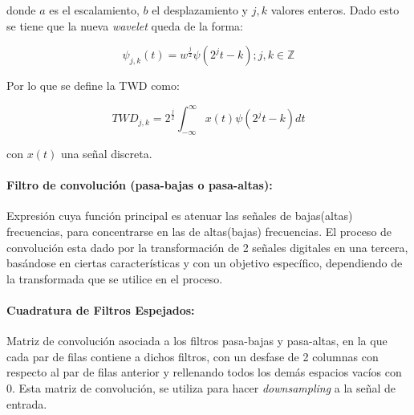 \documentclass[11pt]{article}
\begin{document}
donde \(a\) es el escalamiento, \(b\) el desplazamiento y \(j, k\) valores enteros. Dado esto se tiene que la nueva {\it wavelet} queda de la forma:

\begin{equation*}
    \psi_{j, k}(t)= w^{\frac{j}{2}}\psi(2^{j}t - k); j, k \in \mathbb{Z}
\end{equation*}

Por lo que se define la TWD como:

\begin{equation*}
    TWD_{j, k} = 2^{\frac{j}{2}}\int_{-\infty}^{\infty}x(t)\psi(2^{j}t-k)dt
\end{equation*}

con \(x(t)\) una señal discreta. 

\paragraph*{Filtro de convolución (pasa-bajas o pasa-altas):}
Expresión cuya función principal es atenuar las señales de bajas(altas) frecuencias, para concentrarse en las de altas(bajas) frecuencias. El proceso de convolución esta dado por la transformación de 2 señales digitales en una tercera, basándose en ciertas 
características y con un objetivo específico, dependiendo de la transformada que se utilice en el proceso.

\paragraph*{Cuadratura de Filtros Espejados:}
Matriz de convolución asociada a los filtros pasa-bajas y pasa-altas, en la que cada par de filas contiene a dichos filtros, con un desfase de 2 columnas con respecto al par de filas anterior y rellenando todos los demás espacios vacíos con 0. Esta matriz de convolución, 
se utiliza para hacer {\it downsampling} a la señal de entrada.
\end{document}
